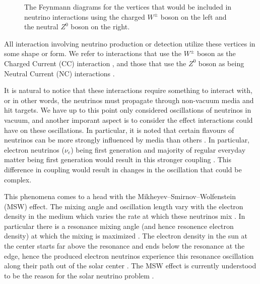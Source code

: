 \begin{figure}
  \centering
  \hspace{2em}
  \caption{The Feynmann diagrams for the vertices that would be included in neutrino interactions using the charged $W^{\pm}$ boson on the left and the neutral $Z^{0}$ boson on the right.}
  \label{fig:nvert}
\end{figure}

All interaction involving neutrino production or detection utilize these vertices in some shape or form. We refer to interactions that use the $W^{\pm}$ boson as the Charged Current (CC) interaction \cite{currents}, and those that use the $Z^{0}$ boson as being Neutral Current (NC) interactions \cite{currents}.

It is natural to notice that these interactions require something to interact with, or in other words, the neutrinos must propagate through non-vacuum media and hit targets. We have up to this point only considered oscillations of neutrinos in vacuum, and another imporant aspect is to consider the effect interactions could have on these oscillations. In particular, it is noted that certain flavours of neutrinos can be more strongly influenced by media than others \cite{solar_nu,msw}. In particular, electron neutrinos ($\nu_{e}$) being first generation and majority of regular everyday matter being first generation would result in this stronger coupling \cite{solar_nu,msw}. This difference in coupling would result in changes in the oscillation that could be complex.

This phenomena comes to a head with the Mikheyev–Smirnov–Wolfenstein (MSW) effect. The mixing angle and oscillation length vary with the electron density in the medium which varies the rate at which these neutrinos mix \cite{solar_nu,msw}. In particular there is a resonance mixing angle (and hence resonence electron density) at which the mixing is maximized \cite{solar_nu,msw}. The electron density in the sun at the center starts far above the resonance and ends below the resonance at the edge, hence the produced electron neutrinos experience this resonance oscillation along their path out of the solar center \cite{solar_nu,msw}. The MSW effect is currently understood to be the reason for the solar neutrino problem \cite{solar_nu}.

